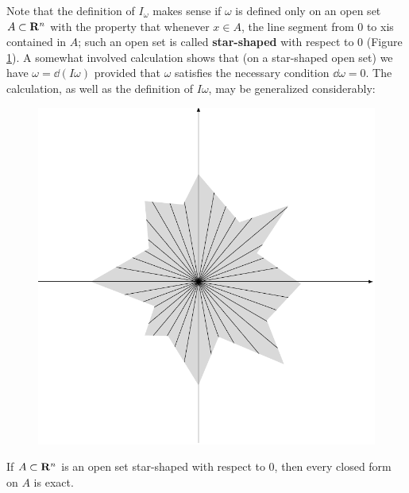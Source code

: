 Note that the definition of $I_\omega$ makes sense if $\omega$ is defined only
on an open set $A\subset \mathbf{R}^n$ with the property that whenever
$x\in A$, the line segment from 0 to xis contained in $A$; such
an open set is called \textbf{star-shaped} with respect to 0 (Figure \ref{Fig 4-3}).
A somewhat involved calculation shows that (on a star-shaped open set) 
we have $\omega = \dd(I\omega)$ provided that $\omega$ satisfies the 
necessary condition $\dd\omega = 0$. The calculation, as well
as the definition of $I\omega$, may be generalized considerably:

\begin{figure}[!htb]
    \centering
    \includegraphics[width=.75\linewidth]{./pics/Fig4-3.pdf}
    \caption{}
    \label{Fig 4-3}
\end{figure}

\begin{theorem}
    If $A\subset \mathbf{R}^n$ is an open set star-shaped with respect to 0, 
    then every closed form on $A$ is exact.
\end{theorem}

